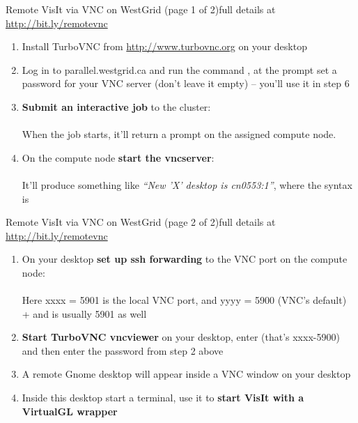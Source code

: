 \begin{frame}{Remote VisIt via VNC on WestGrid (page 1 of 2)}{full details at \url{http://bit.ly/remotevnc}}
  \begin{enumerate}\setlength{\itemsep}{2mm}
  \item Install TurboVNC from \url{http://www.turbovnc.org} on your desktop
  \item Log in to parallel.westgrid.ca and run the command , at the prompt set a
    password for your VNC server (don't leave it empty) -- you'll use it in step 6
  \item {\bf\color{red} Submit an interactive job} to the cluster:\\
    {\footnotesize{}}\\
    When the job starts, it'll return a prompt on the assigned compute node.
  \item On the compute node {\bf\color{red} start the vncserver}:\\
    \\
    It'll produce something like {\it ``New 'X' desktop is cn0553:1''}, where the syntax is
  \end{enumerate}
\end{frame}

\begin{frame}{Remote VisIt via VNC on WestGrid (page 2 of 2)}{full details at \url{http://bit.ly/remotevnc}}
  \begin{enumerate}\setlength{\itemsep}{2mm}
  \item On your desktop {\bf\color{red} set up ssh forwarding} to the VNC port on the compute node:\\
    \\
    Here xxxx = 5901 is the local VNC port, and yyyy = 5900 (VNC's default) + 
    and is usually 5901 as well
  \item {\bf\color{red} Start TurboVNC vncviewer} on your desktop, enter  (that's
    xxxx-5900) and then enter the password from step 2 above
  \item A remote Gnome desktop will appear inside a VNC window on your desktop
  \item Inside this desktop start a terminal, use it to {\bf\color{red} start VisIt with a VirtualGL
    wrapper}\\
    {\footnotesize{}}
  \end{enumerate}
\end{frame}

